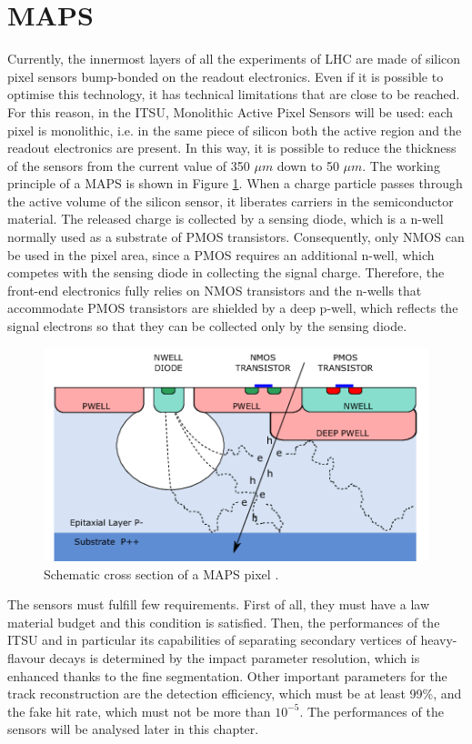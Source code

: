 \section{MAPS}
Currently, the innermost layers of all the experiments of LHC are made of silicon pixel sensors bump-bonded on the readout electronics. Even if it is possible to optimise this technology, it has technical limitations that are close to be reached. For this reason, in the ITSU, Monolithic Active Pixel Sensors will be used: each pixel is monolithic, i.e. in the same piece of silicon both the active region and the readout electronics are present. In this way, it is possible to reduce the thickness of the sensors from the current value of 350 $\mu m$ down to 50 $\mu m$. The working principle of a MAPS is shown in Figure \ref{fig:maps}. When a charge particle passes through the active volume of the silicon sensor, it liberates carriers in the semiconductor material. The released charge is collected by a sensing diode, which is a n-well normally used as a substrate of PMOS transistors. Consequently, only NMOS can be used in the pixel area, since a PMOS requires an additional n-well, which competes with the sensing diode in collecting the signal charge. Therefore, the front-end electronics fully relies on NMOS transistors and the n-wells that accommodate PMOS transistors are shielded by a deep p-well, which reflects the signal electrons so that they can be collected only by the sensing diode.
%
\begin{figure}
  \centering
  \includegraphics[scale=0.7]{figures/maps.png}
  \caption{Schematic cross section of a MAPS pixel \cite{uptdr}.}
  \label{fig:maps}
\end{figure}
%
The sensors must fulfill few requirements. First of all, they must have a law material budget and this condition is satisfied. Then, the performances of the ITSU and in particular its capabilities of separating secondary vertices of heavy-flavour decays is determined by the impact parameter resolution, which is enhanced thanks to the fine segmentation. Other important parameters for the track reconstruction are the detection efficiency, which must be at least 99\%, and the fake hit rate, which must not be more than $10^{-5}$. The performances of the sensors will be analysed later in this chapter.\\

